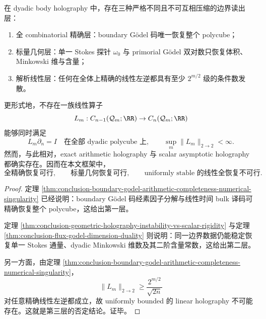 \begin{theorem}\label{thm:conclusion-boundary-holography-three-layer-splitting}
在 dyadic body holography 中，存在三种严格不同且不可互相压缩的边界读出层：
\begin{enumerate}
  \item 全 combinatorial 精确层：boundary Gödel 码唯一恢复整个 polycube；
  \item 标量几何层：单一 Stokes 探针 \(\omega_0\) 与 primorial Gödel 双对数只恢复体积、Minkowski 维与含量；
  \item 解析线性层：任何在全体上精确的线性左逆都具有至少 \(2^{m/2}\) 级的条件数发散。
\end{enumerate}
更形式地，不存在一族线性算子
\[
L_m:C_{n-1}(\mathcal Q_m;\RR)\to C_n(\mathcal Q_m;\RR)
\]
能够同时满足
\[
L_m\partial_n=I\quad\text{在全部 dyadic polycube 上},
\qquad
\sup_m\|L_m\|_{2\to2}<\infty.
\]
然而，与此相对，exact arithmetic holography 与 scalar asymptotic holography 都确实存在。因而在本文框架中，
\[
\text{全精确恢复可行},
\qquad
\text{标量几何恢复可行},
\qquad
\text{uniformly stable 的线性全恢复不可行}.
\]
\end{theorem}
\begin{proof}
定理 \ref{thm:conclusion-boundary-godel-arithmetic-completeness-numerical-singularity} 已经说明：boundary Gödel 码经素因子分解与线性时间 bulk 译码可精确恢复整个 polycube，这给出第一层。

定理 \ref{thm:conclusion-geometric-holography-instability-vs-scalar-rigidity} 与定理 \ref{thm:conclusion-flux-godel-dimension-duality} 则说明：同一边界数据仍能稳定恢复单一 Stokes 通量、dyadic Minkowski 维数及其二阶含量常数，这给出第二层。

另一方面，由定理 \ref{thm:conclusion-boundary-godel-arithmetic-completeness-numerical-singularity}，
\[
\|L_m\|_{2\to2}\ge \frac{2^{m/2}}{\sqrt{2n}}
\]
对任意精确线性左逆都成立，故 uniformly bounded 的 linear holography 不可能存在。这就是第三层的否定结论。证毕。
\end{proof}

